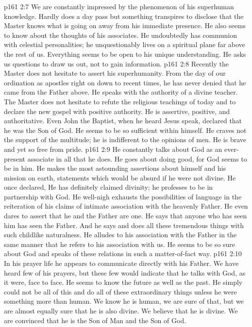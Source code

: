 \vs p161 2:7 \bibnobreakspace We are constantly impressed by the phenomenon of his superhuman knowledge. Hardly does a day pass but something transpires to disclose that the Master knows what is going on away from his immediate presence. He also seems to know about the thoughts of his associates. He undoubtedly has communion with celestial personalities; he unquestionably lives on a spiritual plane far above the rest of us. Everything seems to be open to his unique understanding. He asks us questions to draw us out, not to gain information.
\vs p161 2:8 \bibnobreakspace Recently the Master does not hesitate to assert his superhumanity. From the day of our ordination as apostles right on down to recent times, he has never denied that he came from the Father above. He speaks with the authority of a divine teacher. The Master does not hesitate to refute the religious teachings of today and to declare the new gospel with positive authority. He is assertive, positive, and authoritative. Even John the Baptist, when he heard Jesus speak, declared that he was the Son of God. He seems to be so sufficient within himself. He craves not the support of the multitude; he is indifferent to the opinions of men. He is brave and yet so free from pride.
\vs p161 2:9 \bibnobreakspace He constantly talks about God as an ever\hyp{}present associate in all that he does. He goes about doing good, for God seems to be in him. He makes the most astounding assertions about himself and his mission on earth, statements which would be absurd if he were not divine. He once declared,  He has definitely claimed divinity; he professes to be in partnership with God. He well\hyp{}nigh exhausts the possibilities of language in the reiteration of his claims of intimate association with the heavenly Father. He even dares to assert that he and the Father are one. He says that anyone who has seen him has seen the Father. And he says and does all these tremendous things with such childlike naturalness. He alludes to his association with the Father in the same manner that he refers to his association with us. He seems to be so sure about God and speaks of these relations in such a matter\hyp{}of\hyp{}fact way.
\vs p161 2:10 \bibnobreakspace In his prayer life he appears to communicate directly with his Father. We have heard few of his prayers, but these few would indicate that he talks with God, as it were, face to face. He seems to know the future as well as the past. He simply could not be all of this and do all of these extraordinary things unless he were something more than human. We know he is human, we are sure of that, but we are almost equally sure that he is also divine. We believe that he is divine. We are convinced that he is the Son of Man and the Son of God.
